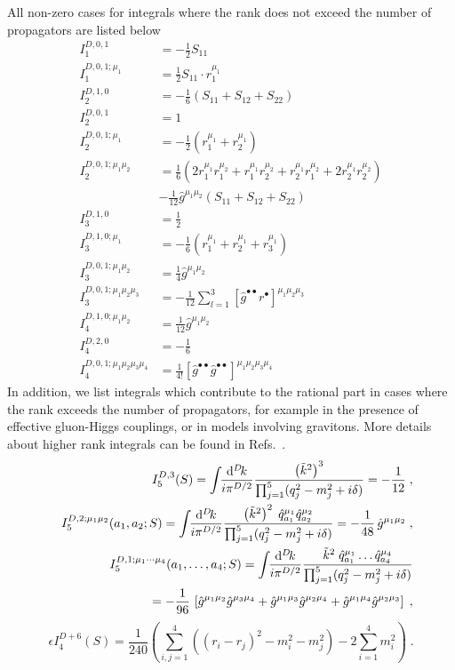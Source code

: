 \documentclass[11pt,a4paper]{refrep}
\newcommand{\diff}[1][{}]{{\mathrm{d}}^{#1}\!}
\newcommand{\bea}{\begin{eqnarray*}}
\newcommand{\eea}{\end{eqnarray*}\noindent}
\newcommand{\be}{\begin{equation}}
\newcommand{\ee}{\end{equation}}
\newcommand{\nn}{\nonumber}
\def\eps{\epsilon}
\begin{document}
All  non-zero cases for 
integrals where the rank does not exceed the number of propagators are listed
 below~\cite{Binoth:2006hk,Reiter:2009kb}
\begin{align}
I_1^{D,0,1}&=-\frac12 S_{11}\\
I_1^{D,0,1;\mu_1}&=\frac12 S_{11} \cdot r_1^{\mu_1}\\
I_2^{D,1,0}&=-\frac16\left(S_{11}+S_{12}+S_{22}\right)\\
I_2^{D,0,1}&=1\\
I_2^{D,0,1;\mu_1}&=-\frac12\left(r_1^{\mu_1}+r_2^{\mu_1}\right)\\
I_2^{D,0,1;\mu_1\mu_2}&=
\frac16\left(%
2r_1^{\mu_1}r_1^{\mu_2}
+r_1^{\mu_1}r_2^{\mu_2}
+r_2^{\mu_1}r_1^{\mu_2}
+2r_2^{\mu_1}r_2^{\mu_2}\right)\nonumber\\
&-\frac1{12}\hat{g}^{\mu_1\mu_2}\left(S_{11}+S_{12}+S_{22}\right)\\
I_3^{D,1,0}&=\frac12\\
I_3^{D,1,0;\mu_1}&=-\frac16\left(r_1^{\mu_1}+r_2^{\mu_1}+r_3^{\mu_1}\right)\\
I_3^{D,0,1;\mu_1\mu_2}&=\frac14\hat{g}^{\mu_1\mu_2}\\
I_3^{D,0,1;\mu_1\mu_2\mu_3}&=-\frac{1}{12}
\sum_{l=1}^3\left[\hat{g}^{\bullet\bullet}r^{\bullet}\right]^{\mu_1\mu_2\mu_3}%
\\
I_4^{D,1,0;\mu_1\mu_2}&=\frac{1}{12}\hat{g}^{\mu_1\mu_2}\\
I_4^{D,2,0}&=-\frac16\\
I_4^{D,0,1;\mu_1\mu_2\mu_3\mu_4}&=\frac1{4!}\left[\hat{g}^{\bullet\bullet}%
\hat{g}^{\bullet\bullet}\right]^{\mu_1\mu_2\mu_3\mu_4}
\end{align}
In addition, we list integrals which contribute to the rational part in cases where the rank exceeds the number of 
propagators, for example in the presence of effective gluon-Higgs couplings, or in models involving 
gravitons.  
More details about higher rank integrals can be found in
Refs.~\cite{Guillet:2013msa,Mastrolia:2012bu,vanDeurzen:2013pja}.
\bea
&&I_5^{D,3}(S)=
\int\!\!\frac{\diff[D]k}{i\pi^{D/2}}\frac{\left(\tilde{k}^2\right)^3
}{%
\prod_{j=1}^5(q_j^2-m_j^2+i\delta)}=-\frac{1}{12}\;,\\
%
&&I_5^{D,2;\mu_1 \mu_2}(a_1,a_2; S)=
\int\!\!\frac{\diff[D]k}{i\pi^{D/2}}\frac{\left(\tilde{k}^2\right)^2\;
\hat{q}_{a_1}^{\mu_1}  \hat{q}_{a_2}^{\mu_2}}{%
\prod_{j=1}^5(q_j^2-m_j^2+i\delta)}=-\frac{1}{48}\,\hat{g}^{\mu_1\mu_2}\;,\\
%
&&I_5^{D,1;\mu_1\cdots \mu_4}(a_1,\ldots,a_4; S)=
\int\!\!\frac{\diff[D]k}{i\pi^{D/2}}\frac{\tilde{k}^2\;
\hat{q}_{a_1}^{\mu_1} \ldots \hat{q}_{a_4}^{\mu_4}}{%
\prod_{j=1}^5(q_j^2-m_j^2+i\delta)}\nn\\
&&\qquad =-\frac{1}{96}\,
\left[\hat{g}^{\mu_1\mu_2}\hat{g}^{\mu_3\mu_4}+ \hat{g}^{\mu_1\mu_3}\hat{g}^{\mu_2\mu_4}
+\hat{g}^{\mu_1\mu_4}\hat{g}^{\mu_2\mu_3}\right]\;,
\eea
\be
\eps I_4^{D+6}(S)=\frac{1}{240}\left(\sum_{i,j=1}^4 ((r_i-r_j)^2-m_i^2-m_j^2)-2\sum_{i=1}^4 m_i^2\right)\;.
\ee
\end{document}
